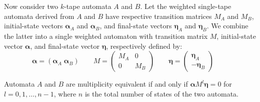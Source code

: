 \documentclass[runningheads]{llncs}
\newcommand{\valpha}{\boldsymbol{\alpha}}
\newcommand{\veta}{\boldsymbol{\eta}}
\begin{document}
Now consider two $k$-tape automata $A$ and $B$.  Let the weighted
single-tape automata derived from $A$ and $B$ have respective
transition matrices $M_A$ and $M_B$, initial-state vectors $\valpha_A$
and $\valpha_B$, and final-state vectors $\veta_A$ and $\veta_B$.  We
combine the latter into a single weighted automaton with transition
matrix $M$, initial-state vector $\valpha$, and final-state vector
$\veta$, respectively defined by:
\[ \valpha = ( \valpha_A \; \valpha_B) \qquad
   M = \left(\begin{array}{cc} M_A & 0\\ 0 & M_B 
     \end{array} \right) \qquad
   \veta = \left(\begin{array}{c} \veta_A \\ -\veta_B 
     \end{array} \right) \qquad
\]
\begin{proposition}
  Automata $A$ and $B$ are multiplicity equivalent if and only if
  $\valpha M^l \veta = 0$ for $l=0,1,\ldots,n-1$, where $n$ is the
  total number of states of the two automata.
\label{prop:main}
\end{proposition}
\end{document}
